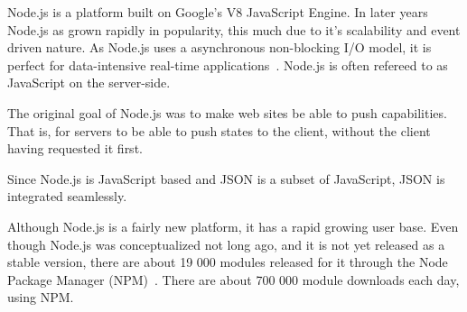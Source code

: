 Node.js is a platform built on Google's V8 JavaScript Engine. In later years Node.js as grown rapidly in popularity, this much due to it's scalability and event driven nature. As Node.js uses a asynchronous non-blocking I/O model, it is perfect for data-intensive real-time applications~\cite{site:nodejs}. Node.js is often refereed to as JavaScript on the server-side. 

The original goal of Node.js was to make web sites be able to push capabilities. That is, for servers to be able to push states to the client, without the client having requested it first. 

Since Node.js is JavaScript based and JSON is a subset of JavaScript, JSON is integrated seamlessly. 

Although Node.js is a fairly new platform, it has a rapid growing user base. Even though Node.js was conceptualized not long ago, and it is not yet released as a stable version, there are about 19 000 modules released for it through the Node Package Manager (NPM)~\cite{site:npm}. There are about 700 000 module downloads each day, using NPM. 